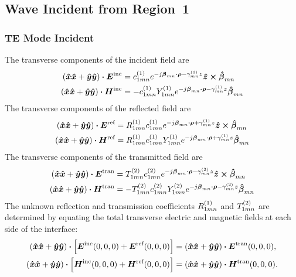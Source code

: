 \subsection{Wave Incident from Region~1}
\label{sec:1inc}
\subsubsection{TE Mode Incident}
\label{sec:1incTE}
The transverse components of the incident field are
\begin{subequations}
  \begin{align}
    (\x\x + \y\y) \bdot \E\inc &= c\one_{1mn}
    e^{-j\vecbeta_{mn}\bdot\vecrho - \gamma\one_{mn} z} 
    \z\cross\betahat_{mn} \\
    (\x\x + \y\y) \bdot \H\inc &= -c\one_{1mn} Y\one_{1mn}
    e^{-j\vecbeta_{mn}\bdot\vecrho - \gamma\one_{mn} z} 
    \betahat_{mn}
  \end{align}
\end{subequations}
The transverse components of the reflected field are
\begin{subequations}
  \begin{align}
    (\x\x + \y\y) \bdot \E\refl &= R\one_{1mn} c\one_{1mn}
    e^{-j\vecbeta_{mn}\bdot\vecrho + \gamma\one_{mn} z} 
    \z\cross\betahat_{mn} \\
    (\x\x + \y\y) \bdot \H\refl &= R\one_{1mn} c\one_{1mn} Y\one_{1mn}
    e^{-j\vecbeta_{mn}\bdot\vecrho + \gamma\one_{mn} z} 
    \betahat_{mn}
  \end{align}
\end{subequations}
The transverse components of the transmitted field are
\begin{subequations}
  \begin{align}
    (\x\x + \y\y) \bdot \E\trans &= T\two_{1mn} c\two_{1mn}
    e^{-j\vecbeta_{mn}\bdot\vecrho - \gamma\two_{mn} z} 
    \z\cross\betahat_{mn} \\
    (\x\x + \y\y) \bdot \H\trans &= -T\two_{1mn} c\two_{1mn} Y\two_{1mn}
    e^{-j\vecbeta_{mn}\bdot\vecrho - \gamma\two_{mn} z} 
    \betahat_{mn}
  \end{align}
\end{subequations}
The unknown reflection and transmission coefficients $R\one_{1mn}$ and
$T\two_{1mn}$ are determined by equating the total transverse electric
and magnetic fields at each side of the interface:
\begin{subequations}
  \begin{align}
    (\x\x+\y\y) \bdot \left[\E\inc(0,0,0) + \E\refl(0,0,0)\right] &= 
    (\x\x+\y\y) \bdot \E\trans(0,0,0), \\
    (\x\x+\y\y) \bdot \left[\H\inc(0,0,0) + \H\refl(0,0,0)\right] &= 
    (\x\x+\y\y) \bdot \H\trans(0,0,0).
  \end{align}
\end{subequations}
